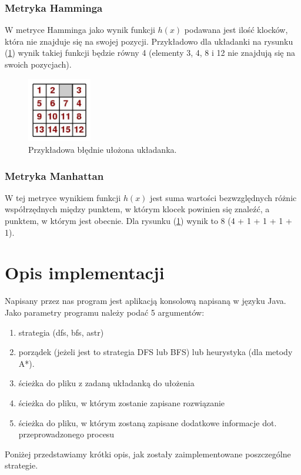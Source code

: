 \documentclass{classrep}
\begin{document}
\subsubsection{Metryka Hamminga}
W metryce Hamminga jako wynik funkcji $h(x)$ podawana jest ilość klocków, która nie znajduje się na swojej pozycji. Przykładowo dla układanki na rysunku (\ref{blednaukladanka}) wynik takiej funkcji będzie równy 4 (elementy 3, 4, 8 i 12 nie znajdują się na swoich pozycjach).
\begin{figure}[h!]
    \centering
    \includegraphics[width=0.25\textwidth]{15wrong1.jpg}
    \caption{Przykładowa błędnie ułożona układanka.}
	\label{blednaukladanka}
\end{figure}

\subsubsection{Metryka Manhattan}
W tej metryce wynikiem funkcji $h(x)$ jest suma wartości bezwzględnych różnic współrzędnych między punktem, w którym klocek powinien się znaleźć, a punktem, w którym jest obecnie. Dla rysunku (\ref{blednaukladanka}) wynik to 8 (4 + 1 + 1 + 1 + 1).

\section{Opis implementacji}
Napisany przez nas program jest aplikacją konsolową napisaną w języku Java. Jako parametry programu należy podać 5 argumentów:
\begin{enumerate}
\item strategia (dfs, bfs, astr)
\item porządek (jeżeli jest to strategia DFS lub BFS) lub heurystyka (dla metody A*). 
\item ścieżka do pliku z zadaną układanką do ułożenia
\item ścieżka do pliku, w którym zostanie zapisane rozwiązanie
\item ścieżka do pliku, w którym zostaną zapisane dodatkowe informacje dot. przeprowadzonego procesu
\end{enumerate}
Poniżej przedstawiamy krótki opis, jak zostały zaimplementowane poszczególne strategie.
\end{document}
